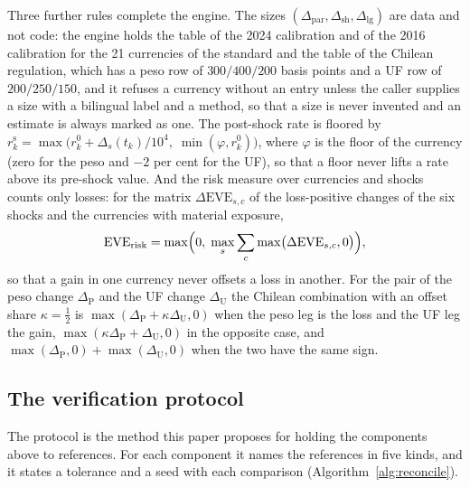 Three further rules complete the engine. The sizes $(\Delta_{\mathrm{par}},\Delta_{\mathrm{sh}},\Delta_{\mathrm{lg}})$ are data and not code: the engine holds the table of the 2024 calibration and of the 2016 calibration for the 21 currencies of the standard and the table of the Chilean regulation, which has a peso row of $300/400/200$ basis points and a UF row of $200/250/150$, and it refuses a currency without an entry unless the caller supplies a size with a bilingual label and a method, so that a size is never invented and an estimate is always marked as one. The post-shock rate is floored by $r_k^{\mathrm{s}}=\max\bigl(r_k^0+\Delta_s(t_k)/10^4,\;\min(\varphi,r_k^0)\bigr)$, where $\varphi$ is the floor of the currency (zero for the peso and $-2$ per cent for the UF), so that a floor never lifts a rate above its pre-shock value. And the risk measure over currencies and shocks counts only losses: for the matrix $\Delta\mathrm{EVE}_{s,c}$ of the loss-positive changes of the six shocks and the currencies with material exposure,
\begin{equation}
  \mathrm{EVE}_{\mathrm{risk}}=\max\Bigl(0,\;\max_{s}\sum_{c}\max\bigl(\Delta\mathrm{EVE}_{s,c},0\bigr)\Bigr),
  \label{eq:everisk}
\end{equation}
so that a gain in one currency never offsets a loss in another. For the pair of the peso change $\Delta_{\mathrm{P}}$ and the UF change $\Delta_{\mathrm{U}}$ the Chilean combination with an offset share $\kappa=\tfrac12$ is $\max(\Delta_{\mathrm{P}}+\kappa\Delta_{\mathrm{U}},0)$ when the peso leg is the loss and the UF leg the gain, $\max(\kappa\Delta_{\mathrm{P}}+\Delta_{\mathrm{U}},0)$ in the opposite case, and $\max(\Delta_{\mathrm{P}},0)+\max(\Delta_{\mathrm{U}},0)$ when the two have the same sign.

\subsection{The verification protocol}

The protocol is the method this paper proposes for holding the components above to references. For each component it names the references in five kinds, and it states a tolerance and a seed with each comparison (Algorithm~\ref{alg:reconcile}).

